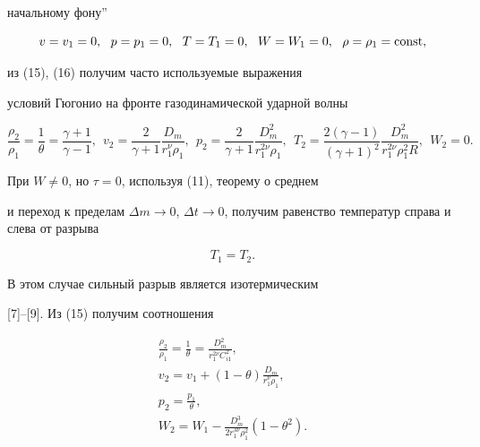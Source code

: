 начальному фону''


\begin{equation}


v = v _1 = 0,\ \ p = p_1 = 0,\ \ T =


T_1 = 0,\ \ W = W_1 = 0,\ \ \rho = \rho _1 = \const,


\end{equation}


из (15), (16) получим часто используемые выражения


условий Гюгонио на фронте газодинамической ударной волны


\begin{equation}


\frac {\rho _2} {\rho _1} = \frac {1}{\theta} =


\frac {\gamma +1}{\gamma -1},\ \ v _2 = \frac {2}{\gamma +1}


\frac {D_{m}}{r^{\nu}_1 \rho _1},\ \ p_2 = \frac {2}{\gamma +1}


\frac {D_{m}^2}{r^{2 \nu} _1 \rho _1},\ \ T_2 = \frac {2(\gamma


-1)} {(\gamma +1)^2} \frac {D_{m}^2}{r^{2 \nu} _1 \rho ^2 _1 R},


\ \ W_2 = 0.


\end{equation}





При $W \neq 0$, но $\tau = 0$, используя (11), теорему о среднем


и переход к пределам $\Delta m \rightarrow 0$, $\Delta t


\rightarrow 0$, получим равенство температур справа и слева от разрыва


\begin{equation}


T_{1} = T_{2}.


\end{equation}


В этом случае сильный разрыв является изотермическим


[7]--[9]. Из (15) получим соотношения


\begin{gather}


\frac {\rho _{2}} {\rho_{1}} = \frac {1}{\theta} =


\frac {D_{m}^{2}} {r_{1}^{2 \nu} C_{i 1}^{2}},\tag{20.1}\\


%


v _{2} = v _{1} + (1- \theta) \frac


{D_{m}}{r_{1}^{\nu} \rho_{1}},\tag{20.2}\\


%


p_{2} = \frac {p_{1}} {\theta},\tag{20.3}\\


%


W_{2} = W_{1} - \frac {D_{m}^{3}}{2 r_{1}^{3 \nu}


\rho _{1}^{2}} (1- \theta ^{2}).\tag{20.4}


\end{gather}


